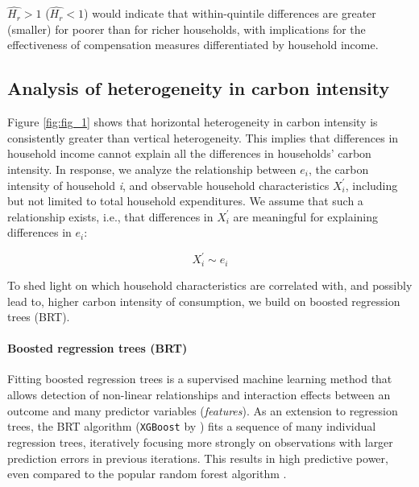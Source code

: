 \documentclass[12pt, a4paper]{article}
\begin{document}
$\widehat{H_{r}}>1$ ($\widehat{H_{r}}<1$) would indicate that within-quintile differences are greater (smaller) for poorer than for richer households, with implications for the effectiveness of compensation measures differentiated by household income. 

\subsection{Analysis of heterogeneity in carbon intensity} \label{sec:methods}

Figure \ref{fig:fig_1} shows that horizontal heterogeneity in carbon intensity is consistently greater than vertical heterogeneity. This implies that differences in household income cannot explain all the differences in households' carbon intensity. In response, we analyze the relationship between $e_{i}$, the carbon intensity of household \textit{i}, and observable household characteristics $X_{i}^{'}$, including but not limited to total household expenditures. We assume that such a relationship exists, i.e., that differences in $X_{i}^{'}$ are meaningful for explaining differences in $e_{i}$:

\begin{equation} \label{eq:relationship}
    X_{i}^{'} \sim e_{i} 
\end{equation}


To shed light on which household characteristics are correlated with, and possibly lead to, higher carbon intensity of consumption, we build on boosted regression trees (BRT).

\paragraph{Boosted regression trees (BRT)} Fitting boosted regression trees \autocite{Friedman.2003, Elith.2008} is a supervised machine learning method that allows detection of non-linear relationships and interaction effects between an outcome and many predictor variables (\textit{features}). As an extension to regression trees, the BRT algorithm (\texttt{XGBoost} by \textcite{Chen.2016}) fits a sequence of many individual regression trees, iteratively focusing more strongly on observations with larger prediction errors in previous iterations. This results in high predictive power, even compared to the popular random forest algorithm \autocite[e.g.,][]{Bentejac.2021}.
\end{document}
